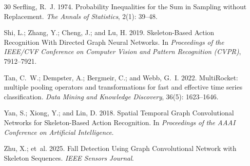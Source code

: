\begin{thebibliography}{30}
Serfling, R.~J. 1974.
\newblock Probability Inequalities for the Sum in Sampling without Replacement.
\newblock \emph{The Annals of Statistics}, 2(1): 39--48.

Shi, L.; Zhang, Y.; Cheng, J.; and Lu, H. 2019.
\newblock Skeleton-Based Action Recognition With Directed Graph Neural Networks.
\newblock In \emph{Proceedings of the IEEE/CVF Conference on Computer Vision and Pattern Recognition (CVPR)}, 7912--7921.

Tan, C.~W.; Dempster, A.; Bergmeir, C.; and Webb, G.~I. 2022.
\newblock MultiRocket: multiple pooling operators and transformations for fast and effective time series classification.
\newblock \emph{Data Mining and Knowledge Discovery}, 36(5): 1623--1646.

Yan, S.; Xiong, Y.; and Lin, D. 2018.
\newblock Spatial Temporal Graph Convolutional Networks for Skeleton-Based Action Recognition.
\newblock In \emph{Proceedings of the AAAI Conference on Artificial Intelligence}.

Zhu, X.; et~al. 2025.
\newblock Fall Detection Using Graph Convolutional Network with Skeleton Sequences.
\newblock \emph{IEEE Sensors Journal}.

\end{thebibliography}
